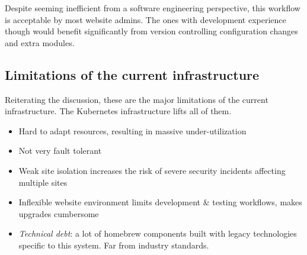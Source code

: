 Despite seeming inefficient from a software engineering perspective, this workflow is acceptable by most website admins.
The ones with development experience though would benefit significantly from version controlling configuration changes and extra modules.

\subsection{Limitations of the current infrastructure}

Reiterating the discussion, these are the major limitations of the current infrastructure.
The Kubernetes infrastructure lifts all of them.

\begin{itemize}
    \item Hard to adapt resources, resulting in massive under-utilization
    \item Not very fault tolerant
    \item Weak site isolation increases the risk of severe security incidents affecting multiple sites
    \item Inflexible website environment limits development \& testing workflows, makes upgrades cumbersome 
    \item \emph{Technical debt}: a lot of homebrew components built with legacy technologies specific to this system.
          Far from industry standards.
\end{itemize}
